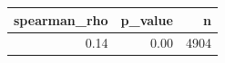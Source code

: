 \begin{tabular}{rrr}
\toprule
spearman_rho & p_value & n \\
\midrule
0.14 & 0.00 & 4904 \\
\bottomrule
\end{tabular}
